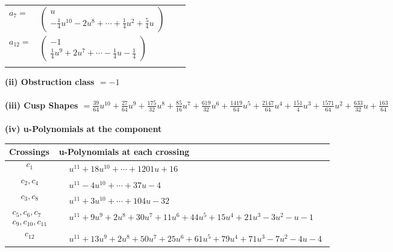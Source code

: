 \documentclass[1p]{elsarticle_modified}
\theoremstyle{definition}
\begin{document}
\begin{tabular}{m{7pt} m{180pt} m{7pt} m{180pt} }
\flushright $a_{7}=$&$\begin{pmatrix}u\\-\frac{1}{4} u^{10}-2 u^8+\cdots+\frac{1}{4} u^2+\frac{5}{4} u\end{pmatrix}$ \\
\flushright $a_{12}=$&$\begin{pmatrix}-1\\\frac{1}{4} u^9+2 u^7+\cdots-\frac{1}{4} u-\frac{1}{4}\end{pmatrix}$\\&\end{tabular}
\flushleft \textbf{(ii) Obstruction class $= -1$}\\~\\
\flushleft \textbf{(iii) Cusp Shapes $= \frac{39}{64} u^{10}+\frac{27}{64} u^9+\frac{175}{32} u^8+\frac{85}{16} u^7+\frac{619}{32} u^6+\frac{1419}{64} u^5+\frac{2147}{64} u^4+\frac{151}{4} u^3+\frac{1571}{64} u^2+\frac{633}{32} u+\frac{163}{64}$}\\~\\
\newpage\renewcommand{\arraystretch}{1}
\flushleft \textbf{(iv) u-Polynomials at the component}\newline \\
\begin{tabular}{m{50pt}|m{274pt}}
Crossings & \hspace{64pt}u-Polynomials at each crossing \\
\hline $$\begin{aligned}c_{1}\end{aligned}$$&$\begin{aligned}
&u^{11}+18 u^{10}+\cdots+1201 u+16
\end{aligned}$\\
\hline $$\begin{aligned}c_{2},c_{4}\end{aligned}$$&$\begin{aligned}
&u^{11}-4 u^{10}+\cdots+37 u-4
\end{aligned}$\\
\hline $$\begin{aligned}c_{3},c_{8}\end{aligned}$$&$\begin{aligned}
&u^{11}+3 u^{10}+\cdots+104 u-32
\end{aligned}$\\
\hline $$\begin{aligned}c_{5},c_{6},c_{7}\\c_{9},c_{10},c_{11}\end{aligned}$$&$\begin{aligned}
&u^{11}+9 u^9+2 u^8+30 u^7+11 u^6+44 u^5+15 u^4+21 u^3-3 u^2- u-1
\end{aligned}$\\
\hline $$\begin{aligned}c_{12}\end{aligned}$$&$\begin{aligned}
&u^{11}+13 u^9+2 u^8+50 u^7+25 u^6+61 u^5+79 u^4+71 u^3-7 u^2-4 u-4
\end{aligned}$\\
\hline
\end{tabular}\\~\\
\end{document}
